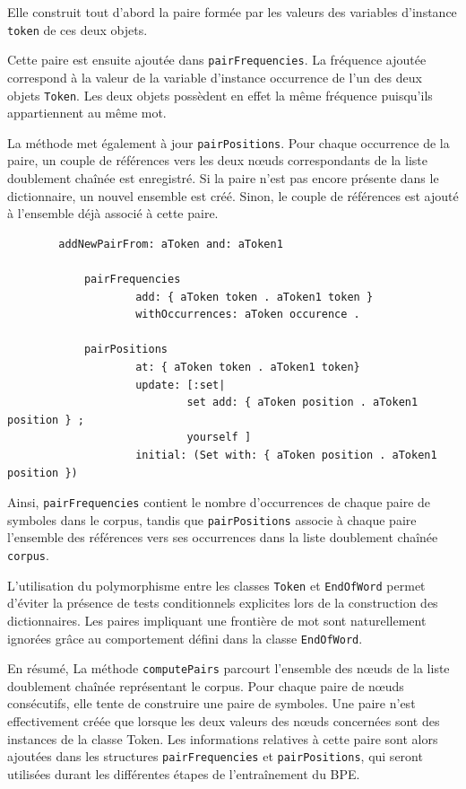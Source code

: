 \documentclass[12pt,a4paper]{report}
\begin{document}
	Elle construit tout d'abord la paire formée par les valeurs des variables d'instance \texttt{token} de ces deux objets.
	
	Cette paire est ensuite ajoutée dans \texttt{pairFrequencies}. La fréquence ajoutée correspond à la valeur de la variable d'instance occurrence de l'un des deux objets \texttt{Token}. Les deux objets possèdent en effet la même fréquence puisqu'ils appartiennent au même mot.
	
	La méthode met également à jour \texttt{pairPositions}. Pour chaque occurrence de la paire, un couple de références vers les deux nœuds correspondants de la liste doublement chaînée est enregistré. Si la paire n'est pas encore présente dans le dictionnaire, un nouvel ensemble est créé. Sinon, le couple de références est ajouté à l'ensemble déjà associé à cette paire.
	
	\begin{verbatim}
		addNewPairFrom: aToken and: aToken1
		
			pairFrequencies
					add: { aToken token . aToken1 token }
					withOccurrences: aToken occurence .
					
			pairPositions
					at: { aToken token . aToken1 token}
					update: [:set|
							set add: { aToken position . aToken1 position } ;
							yourself ]
					initial: (Set with: { aToken position . aToken1 position })
	\end{verbatim}
	
	Ainsi, \texttt{pairFrequencies} contient le nombre d'occurrences de chaque paire de symboles dans le corpus, tandis que \texttt{pairPositions} associe à chaque paire l'ensemble des références vers ses occurrences dans la liste doublement chaînée \texttt{corpus}.
	
	L'utilisation du polymorphisme entre les classes \texttt{Token} et \texttt{EndOfWord} permet d'éviter la présence de tests conditionnels explicites lors de la construction des dictionnaires. Les paires impliquant une frontière de mot sont naturellement ignorées grâce au comportement défini dans la classe \texttt{EndOfWord}.
	
	En résumé, La méthode \texttt{computePairs} parcourt l'ensemble des nœuds de la liste doublement chaînée représentant le corpus. Pour chaque paire de nœuds consécutifs, elle tente de construire une paire de symboles. Une paire n'est effectivement créée que lorsque les deux valeurs des nœuds concernées sont des instances de la classe Token. Les informations relatives à cette paire sont alors ajoutées dans les structures \texttt{pairFrequencies} et \texttt{pairPositions}, qui seront utilisées durant les différentes étapes de l'entraînement du BPE.
	
\end{document}
